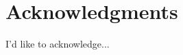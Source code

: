 \documentclass[11pt,a4paper]{article}
\begin{document}



\section*{Acknowledgments}

I'd like to acknowledge...




\end{document}
